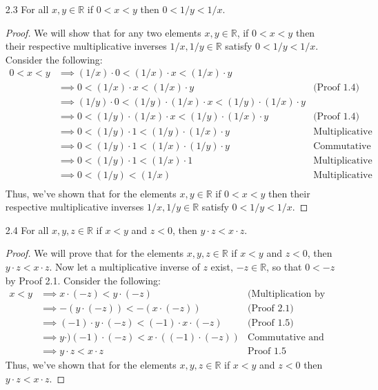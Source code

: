 \documentclass[12pt, letterpaper]{article}
\theoremstyle{plain}
\theoremstyle{definition}
\theoremstyle{remark}
\begin{document}
\begin{itemize}
\item[2.3] For all $x,y\in\mathbb{R}$ if $0<x<y$ then $0<1/y<1/x$.
\begin{proof}
We will show that for any two elements $x,y\in\mathbb{R}$, if $0<x<y$ then their respective multiplicative inverses $1/x,1/y\in\mathbb{R}$ satisfy $0<1/y<1/x$. Consider the following:
\begin{align*}
    0<x<y &\implies (1/x)\cdot 0 < (1/x)\cdot x < (1/x)\cdot y \\
          &\implies 0 < (1/x)\cdot x < (1/x)\cdot y &\text{(Proof 1.4)} \\
          &\implies (1/y)\cdot 0 < (1/y)\cdot (1/x)\cdot x < (1/y)\cdot (1/x)\cdot y \\
          &\implies 0 < (1/y)\cdot (1/x)\cdot x < (1/y)\cdot (1/x)\cdot y &\text{(Proof 1.4)} \\
          &\implies 0 < (1/y)\cdot 1 < (1/y)\cdot (1/x)\cdot y &\text{Multiplicative Inverse} \\
          &\implies 0 < (1/y)\cdot 1 < (1/x)\cdot (1/y)\cdot y &\text{Commutative} \\
          &\implies 0 < (1/y)\cdot 1 < (1/x)\cdot 1 &\text{Multiplicative Inverse} \\
          &\implies 0 < (1/y) < (1/x) &\text{Multiplicative Identity} \\
\end{align*}
Thus, we've shown that for the elements $x,y\in\mathbb{R}$ if $0<x<y$ then their respective multiplicative inverses $1/x,1/y\in\mathbb{R}$ satisfy $0<1/y<1/x$.
\end{proof}

\item[2.4] For all $x,y,z\in\mathbb{R}$ if $x<y$ and $z<0$, then $y\cdot z<x\cdot z$.
\begin{proof}
We will prove that for the elements $x,y,z\in\mathbb{R}$ if $x<y$ and $z<0$, then $y\cdot z<x\cdot z$. Now let a multiplicative inverse of $z$ exist, $-z\in\mathbb{R}$, so that $0<-z$ by Proof 2.1. Consider the following:
\begin{align*}
    x<y &\implies x\cdot (-z)<y\cdot (-z) &\text{(Multiplication by Positives (11))} \\
        &\implies -(y\cdot (-z))<-(x\cdot (-z)) &\text{(Proof 2.1)} \\
        &\implies (-1)\cdot y\cdot (-z)<(-1)\cdot x\cdot (-z) &\text{(Proof 1.5)} \\
        &\implies y\cdot)(-1)\cdot(-z)<x\cdot((-1)\cdot(-z)) &\text{Commutative and Associative)} \\
        &\implies y\cdot z< x\cdot z &\text{Proof 1.5}
\end{align*}
Thus, we've shown that for the elements $x,y,z\in\mathbb{R}$ if $x<y$ and $z<0$ then $y\cdot z<x\cdot z$.
\end{proof}


\end{itemize}
\end{document}
